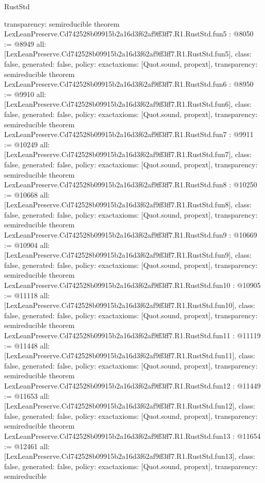 \begin{lexlean}{RustStd}
\begin{coremodule}
{  transparency: semireducible
}
theorem LexLeanPreserve.Cd742528b09915b2a16d3f62af9ff3ff7.R1.RustStd.fun5 : @8050 := @8949 {
  all: [LexLeanPreserve.Cd742528b09915b2a16d3f62af9ff3ff7.R1.RustStd.fun5],
  class: false,
  generated: false,
  policy: exact{axioms: [Quot.sound, propext]},
  transparency: semireducible
}
theorem LexLeanPreserve.Cd742528b09915b2a16d3f62af9ff3ff7.R1.RustStd.fun6 : @8950 := @9910 {
  all: [LexLeanPreserve.Cd742528b09915b2a16d3f62af9ff3ff7.R1.RustStd.fun6],
  class: false,
  generated: false,
  policy: exact{axioms: [Quot.sound, propext]},
  transparency: semireducible
}
theorem LexLeanPreserve.Cd742528b09915b2a16d3f62af9ff3ff7.R1.RustStd.fun7 : @9911 := @10249 {
  all: [LexLeanPreserve.Cd742528b09915b2a16d3f62af9ff3ff7.R1.RustStd.fun7],
  class: false,
  generated: false,
  policy: exact{axioms: [Quot.sound, propext]},
  transparency: semireducible
}
theorem LexLeanPreserve.Cd742528b09915b2a16d3f62af9ff3ff7.R1.RustStd.fun8 : @10250 := @10668 {
  all: [LexLeanPreserve.Cd742528b09915b2a16d3f62af9ff3ff7.R1.RustStd.fun8],
  class: false,
  generated: false,
  policy: exact{axioms: [Quot.sound, propext]},
  transparency: semireducible
}
theorem LexLeanPreserve.Cd742528b09915b2a16d3f62af9ff3ff7.R1.RustStd.fun9 : @10669 := @10904 {
  all: [LexLeanPreserve.Cd742528b09915b2a16d3f62af9ff3ff7.R1.RustStd.fun9],
  class: false,
  generated: false,
  policy: exact{axioms: [Quot.sound, propext]},
  transparency: semireducible
}
theorem LexLeanPreserve.Cd742528b09915b2a16d3f62af9ff3ff7.R1.RustStd.fun10 : @10905 := @11118 {
  all: [LexLeanPreserve.Cd742528b09915b2a16d3f62af9ff3ff7.R1.RustStd.fun10],
  class: false,
  generated: false,
  policy: exact{axioms: [Quot.sound, propext]},
  transparency: semireducible
}
theorem LexLeanPreserve.Cd742528b09915b2a16d3f62af9ff3ff7.R1.RustStd.fun11 : @11119 := @11448 {
  all: [LexLeanPreserve.Cd742528b09915b2a16d3f62af9ff3ff7.R1.RustStd.fun11],
  class: false,
  generated: false,
  policy: exact{axioms: [Quot.sound, propext]},
  transparency: semireducible
}
theorem LexLeanPreserve.Cd742528b09915b2a16d3f62af9ff3ff7.R1.RustStd.fun12 : @11449 := @11653 {
  all: [LexLeanPreserve.Cd742528b09915b2a16d3f62af9ff3ff7.R1.RustStd.fun12],
  class: false,
  generated: false,
  policy: exact{axioms: [Quot.sound, propext]},
  transparency: semireducible
}
theorem LexLeanPreserve.Cd742528b09915b2a16d3f62af9ff3ff7.R1.RustStd.fun13 : @11654 := @12461 {
  all: [LexLeanPreserve.Cd742528b09915b2a16d3f62af9ff3ff7.R1.RustStd.fun13],
  class: false,
  generated: false,
  policy: exact{axioms: [Quot.sound, propext]},
  transparency: semireducible
}
\end{coremodule}
\end{lexlean}
